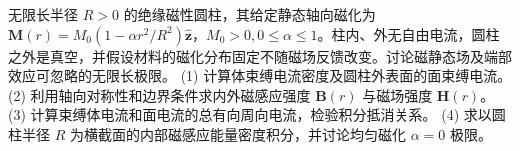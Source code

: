 无限长半径 \(R>0\) 的绝缘磁性圆柱，其给定静态轴向磁化为 \(\mathbf M(r)=M_0(1-\alpha r^2/R^2)\hat{\mathbf z}\)，\(M_0>0,0\le\alpha\le1\)。柱内、外无自由电流，圆柱之外是真空，并假设材料的磁化分布固定不随磁场反馈改变。讨论磁静态场及端部效应可忽略的无限长极限。
(1) 计算体束缚电流密度及圆柱外表面的面束缚电流。
(2) 利用轴向对称性和边界条件求内外磁感应强度 \(\mathbf B(r)\) 与磁场强度 \(\mathbf H(r)\)。
(3) 计算束缚体电流和面电流的总有向周向电流，检验积分抵消关系。
(4) 求以圆柱半径 \(R\) 为横截面的内部磁感应能量密度积分，并讨论均匀磁化 \(\alpha=0\) 极限。
